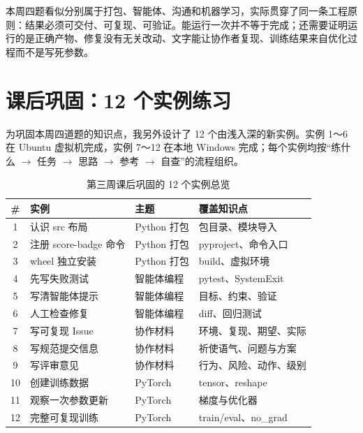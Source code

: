 \documentclass[a4paper, 12pt]{article}
\begin{document}
本周四题看似分别属于打包、智能体、沟通和机器学习，实际贯穿了同一条工程原则：结果必须可交付、可复现、可验证。能运行一次并不等于完成；还需要证明运行的是正确产物、修复没有无关改动、文字能让协作者复现、训练结果来自优化过程而不是写死参数。

\section{课后巩固：12 个实例练习}

为巩固本周四道题的知识点，我另外设计了 12 个由浅入深的新实例。实例 1～6 在 Ubuntu 虚拟机完成，实例 7～12 在本地 Windows 完成；每个实例均按“练什么 $\rightarrow$ 任务 $\rightarrow$ 思路 $\rightarrow$ 参考 $\rightarrow$ 自查”的流程组织。

\begin{table}[htbp]
  \centering
  \small
  \begin{tabular}{cllp{6.1cm}}
    \toprule
    \textbf{\#} & \textbf{实例} & \textbf{主题} & \textbf{覆盖知识点} \\
    \midrule
    1 & 认识 src 布局 & Python 打包 & 包目录、模块导入 \\
    2 & 注册 score-badge 命令 & Python 打包 & pyproject、命令入口 \\
    3 & wheel 独立安装 & Python 打包 & build、虚拟环境 \\
    4 & 先写失败测试 & 智能体编程 & pytest、SystemExit \\
    5 & 写清智能体提示 & 智能体编程 & 目标、约束、验证 \\
    6 & 人工检查修复 & 智能体编程 & diff、回归测试 \\
    7 & 写可复现 Issue & 协作材料 & 环境、复现、期望、实际 \\
    8 & 写规范提交信息 & 协作材料 & 祈使语气、问题与方案 \\
    9 & 写评审意见 & 协作材料 & 行为、风险、动作、级别 \\
    10 & 创建训练数据 & PyTorch & tensor、reshape \\
    11 & 观察一次参数更新 & PyTorch & 梯度与优化器 \\
    12 & 完整可复现训练 & PyTorch & train/eval、no\_grad \\
    \bottomrule
  \end{tabular}
  \caption{第三周课后巩固的 12 个实例总览}
  \label{tab:practice3}
\end{table}
\end{document}
